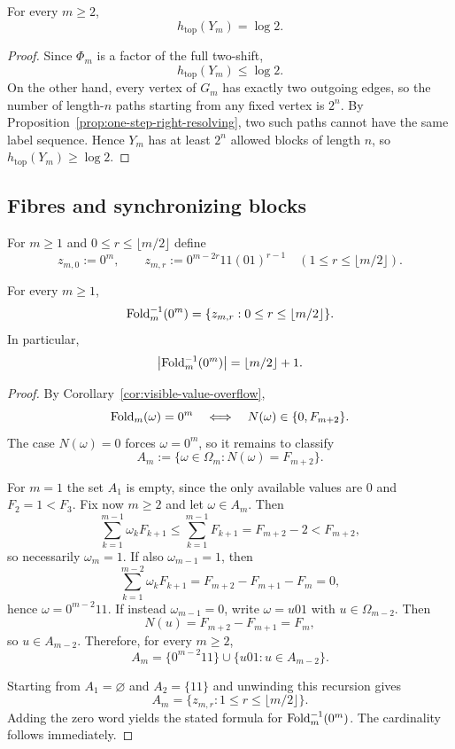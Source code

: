 \begin{corollary}
\label{cor:Phi-m-entropy}
For every $m\ge 2$,
\[
h_{\mathrm{top}}(Y_m)=\log 2.
\]
\end{corollary}

\begin{proof}
Since $\Phi_m$ is a factor of the full two-shift,
\[
h_{\mathrm{top}}(Y_m)\le \log 2.
\]
On the other hand, every vertex of $G_m$ has exactly two outgoing edges, so the
number of length-$n$ paths starting from any fixed vertex is $2^n$.  By
Proposition~\ref{prop:one-step-right-resolving}, two such paths cannot have the
same label sequence.  Hence $Y_m$ has at least $2^n$ allowed blocks of length
$n$, so $h_{\mathrm{top}}(Y_m)\ge \log 2$.
\end{proof}

\subsection{Fibres and synchronizing blocks}

For $m\ge 1$ and $0\le r\le \lfloor m/2\rfloor$ define
\[
z_{m,0}:=0^m,
\qquad
z_{m,r}:=0^{m-2r}11(01)^{r-1}
\quad (1\le r\le \lfloor m/2\rfloor).
\]

\begin{proposition}
\label{prop:zero-fiber-explicit}
For every $m\ge 1$,
\[
\operatorname{Fold}_m^{-1}(0^m)=\{z_{m,r}:0\le r\le \lfloor m/2\rfloor\}.
\]
In particular,
\[
\bigl|\operatorname{Fold}_m^{-1}(0^m)\bigr|=\lfloor m/2\rfloor+1.
\]
\end{proposition}

\begin{proof}
By Corollary~\ref{cor:visible-value-overflow},
\[
\operatorname{Fold}_m(\omega)=0^m
\quad\Longleftrightarrow\quad
N(\omega)\in\{0,F_{m+2}\}.
\]
The case $N(\omega)=0$ forces $\omega=0^m$, so it remains to classify
\[
A_m:=\{\omega\in\Omega_m:N(\omega)=F_{m+2}\}.
\]

For $m=1$ the set $A_1$ is empty, since the only available values are $0$ and
$F_2=1<F_3$.  Fix now $m\ge 2$ and let $\omega\in A_m$.  Then
\[
\sum_{k=1}^{m-1}\omega_kF_{k+1}\le \sum_{k=1}^{m-1}F_{k+1}=F_{m+2}-2<F_{m+2},
\]
so necessarily $\omega_m=1$.  If also $\omega_{m-1}=1$, then
\[
\sum_{k=1}^{m-2}\omega_kF_{k+1}
=
F_{m+2}-F_{m+1}-F_m
=
0,
\]
hence $\omega=0^{m-2}11$.  If instead $\omega_{m-1}=0$, write $\omega=u01$
with $u\in\Omega_{m-2}$.  Then
\[
N(u)=F_{m+2}-F_{m+1}=F_m,
\]
so $u\in A_{m-2}$.  Therefore, for every $m\ge 2$,
\[
A_m=\{0^{m-2}11\}\cup\{u01:u\in A_{m-2}\}.
\]

Starting from $A_1=\varnothing$ and $A_2=\{11\}$ and unwinding this recursion
gives
\[
A_m=\{z_{m,r}:1\le r\le \lfloor m/2\rfloor\}.
\]
Adding the zero word yields the stated formula for $\operatorname{Fold}_m^{-1}(0^m)$.  The
cardinality follows immediately.
\end{proof}


